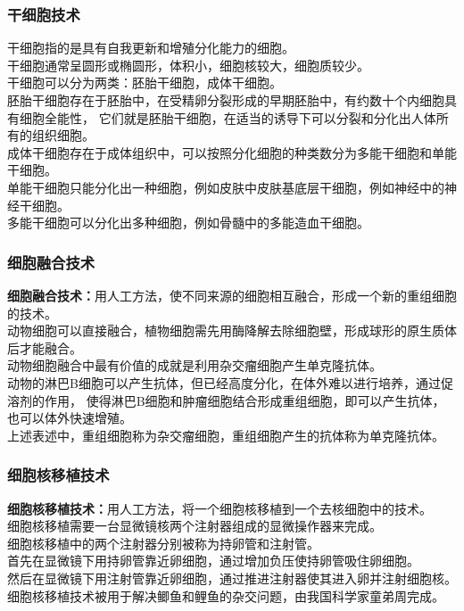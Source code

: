 \documentclass[UTF8]{ctexart}
\begin{document}
\subsubsection{干细胞技术}
    干细胞指的是具有自我更新和增殖分化能力的细胞。\\[3mm]
    干细胞通常呈圆形或椭圆形，体积小，细胞核较大，细胞质较少。\\[3mm]
    干细胞可以分为两类：胚胎干细胞，成体干细胞。\\[3mm]
    胚胎干细胞存在于胚胎中，在受精卵分裂形成的早期胚胎中，有约数十个内细胞具有细胞全能性，
    它们就是胚胎干细胞，在适当的诱导下可以分裂和分化出人体所有的组织细胞。\\[3mm]
    成体干细胞存在于成体组织中，可以按照分化细胞的种类数分为多能干细胞和单能干细胞。\\[3mm]
    单能干细胞只能分化出一种细胞，例如皮肤中皮肤基底层干细胞，例如神经中的神经干细胞。\\[2mm]
    多能干细胞可以分化出多种细胞，例如骨髓中的多能造血干细胞。

\newpage

\subsubsection{细胞融合技术}
    \textbf{细胞融合技术：}用人工方法，使不同来源的细胞相互融合，形成一个新的重组细胞的技术。\\[3mm]
    动物细胞可以直接融合，植物细胞需先用酶降解去除细胞壁，形成球形的原生质体后才能融合。\\[3mm]
    动物细胞融合中最有价值的成就是利用杂交瘤细胞产生单克隆抗体。\\[3mm]
    动物的淋巴B细胞可以产生抗体，但已经高度分化，在体外难以进行培养，通过促溶剂的作用，
    使得淋巴B细胞和肿瘤细胞结合形成重组细胞，即可以产生抗体，也可以体外快速增殖。\\[3mm]
    上述表述中，重组细胞称为杂交瘤细胞，重组细胞产生的抗体称为单克隆抗体。

\subsubsection{细胞核移植技术}
    \textbf{细胞核移植技术：}用人工方法，将一个细胞核移植到一个去核细胞中的技术。\\[3mm]
    细胞核移植需要一台显微镜核两个注射器组成的显微操作器来完成。\\[3mm]
    细胞核移植中的两个注射器分别被称为持卵管和注射管。\\[3mm]
    首先在显微镜下用持卵管靠近卵细胞，通过增加负压使持卵管吸住卵细胞。\\[3mm]
    然后在显微镜下用注射管靠近卵细胞，通过推进注射器使其进入卵并注射细胞核。\\[3mm]
    细胞核移植技术被用于解决鲫鱼和鲤鱼的杂交问题，由我国科学家童弟周完成。
\end{document}
